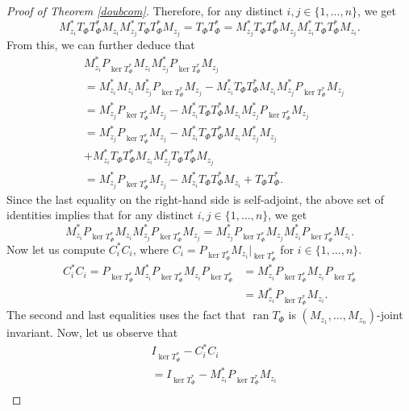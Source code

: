 \documentclass[12pt]{amsart}
\theoremstyle{definition}
\DeclareMathOperator{\ran}{ran}
\newcommand{\1}{{\mbox{\bf 1}}}
\begin{document}
\begin{proof}[Proof of Theorem \ref{doubcom}]
Therefore, for any distinct $i,j \in \{1,\ldots,n\}$, we get
\begin{equation}\label{partial3}
M_{z_i}^* T_{\Phi}  T_{\Phi}^*M_{z_i} M_{z_j}^* T_{\Phi}  T_{\Phi}^*M_{z_j}  =  T_{\Phi} T_{\Phi}^* = M_{z_j}^* T_{\Phi}  T_{\Phi}^*M_{z_j} M_{z_i}^* T_{\Phi}  T_{\Phi}^*M_{z_i}.
\end{equation}
From this, we can further deduce that
\begin{align*}
&M_{z_i}^* P_{\ker T_{\Phi}^*}M_{z_i} M_{z_j}^* P_{\ker T_{\Phi}^*} M_{z_j}  \\
&=  M_{z_i}^* M_{z_i} M_{z_j}^* P_{\ker T_{\Phi}^*} M_{z_j}  - M_{z_i}^* T_{\Phi} T_{\Phi}^* M_{z_i} M_{z_j}^* P_{\ker T_{\Phi}^*} M_{z_j}  \\
&=  M_{z_j}^* P_{\ker T_{\Phi}^*} M_{z_j}  - M_{z_i}^* T_{\Phi} T_{\Phi}^* M_{z_i} M_{z_j}^* P_{\ker T_{\Phi}^*} M_{z_j}  \\
&=  M_{z_j}^* P_{\ker T_{\Phi}^*} M_{z_j}  - M_{z_i}^* T_{\Phi} T_{\Phi}^* M_{z_i} M_{z_j}^*  M_{z_j}\\
&+ M_{z_i}^* T_{\Phi} T_{\Phi}^* M_{z_i} M_{z_j}^* T_{\Phi} T_{\Phi}^* M_{z_j}  \\
&=  M_{z_j}^* P_{\ker T_{\Phi}^*} M_{z_j}  - M_{z_i}^* T_{\Phi} T_{\Phi}^* M_{z_i} + T_{\Phi} T_{\Phi}^*.
\end{align*}
Since the last equality on the right-hand side is self-adjoint, the above set of identities implies that for any distinct $i,j \in \{1,\ldots,n\}$, we get
\begin{equation}\label{partial4}
M_{z_i}^* P_{\ker T_{\Phi}^*}M_{z_i} M_{z_j}^* P_{\ker T_{\Phi}^*} M_{z_j}  =  M_{z_j}^* P_{\ker T_{\Phi}^*} M_{z_j}  M_{z_i}^* P_{\ker T_{\Phi}^*}M_{z_i}.
\end{equation}
Now let us compute $C_i ^* C_i$, where $C_i = P_{\ker T_{\Phi}^*}M_{z_i}|_{\ker T_{\Phi}^*}$ for $i \in \{1,\ldots,n\}$.
\begin{align*}
C_i ^* C_i = P_{\ker T_{\Phi}^*} M_{z_i}^* P_{\ker T_{\Phi}^*}M_{z_i}P_{\ker T_{\Phi}^*}  &= M_{z_i}^* P_{\ker T_{\Phi}^*}M_{z_i}P_{\ker T_{\Phi}^*} \\
&= M_{z_i}^* P_{\ker T_{\Phi}^*}M_{z_i}.
\end{align*}
The second and last equalities uses the fact that $\ran T_{\Phi}$ is $(M_{z_1},\ldots, M_{z_n})$-joint invariant. Now, let us observe that
\begin{align*}
&I_{\ker T_{\Phi}^*} - C_i ^* C_i \\
&=I_{\ker T_{\Phi}^*} -  M_{z_i}^* P_{\ker T_{\Phi}^*}M_{z_i} \\

\end{align*}
\end{proof}
\end{document}
